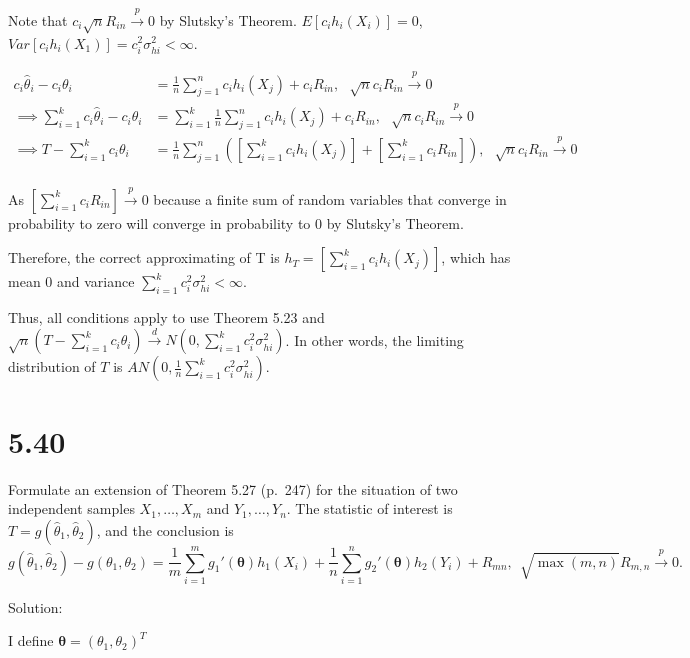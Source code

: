 \documentclass[
  letterpaper,
  DIV=11,
  numbers=noendperiod]{scrreprt}
\begin{document}
Note that \(c_i \sqrt nR_{in} \overset p \to 0\) by Slutsky's Theorem.
\(E[c_i h_i (X_i)] = 0\),
\(Var[c_i h_i (X_1)] = c_i^2 \sigma_{hi}^2 < \infty\).

\[\begin{aligned}
c_i \hat \theta_i - c_i\theta_i &= \frac 1 n \sum_{j=1}^n c_ih_i(X_j) + c_iR_{in},~~~\sqrt n c_iR_{in} \overset p \to 0 \\
\implies \sum_{i=1}^k c_i \hat \theta_i - c_i\theta_i &= \sum_{i=1}^k \frac 1 n \sum_{j=1}^n c_ih_i(X_j) + c_iR_{in},~~~\sqrt n c_iR_{in} \overset p \to 0 \\
\implies T -\sum_{i=1}^k c_i\theta_i &= \frac 1 n \sum_{j=1}^n \left(\left[\sum_{i=1}^k c_ih_i(X_j) \right] + \left[\sum_{i=1}^k c_iR_{in} \right]\right),~~~\sqrt n c_iR_{in} \overset p \to 0 \\
\end{aligned}\]

As \(\left[\sum_{i=1}^k c_iR_{in} \right] \overset p \to 0\) because a
finite sum of random variables that converge in probability to zero will
converge in probability to 0 by Slutsky's Theorem.

Therefore, the correct approximating of T is
\(h_T =\left[\sum_{i=1}^k c_ih_i(X_j) \right]\), which has mean 0 and
variance \(\sum_{i=1}^k c_i^2 \sigma_{hi}^2 < \infty\).

Thus, all conditions apply to use Theorem 5.23 and
\(\sqrt n\left(T -\sum_{i=1}^k c_i\theta_i \right) \overset d \to N\left(0, \sum_{i=1}^k c_i^2 \sigma_{hi}^2\right)\).
In other words, the limiting distribution of \(T\) is
\(AN\left(0, \frac 1 n \sum_{i=1}^k c_i^2 \sigma_{hi}^2\right)\).

\newpage

\hypertarget{section-35}{%
\section{5.40}\label{section-35}}

Formulate an extension of Theorem 5.27 (p.~247) for the situation of two
independent samples \(X_1, \dots, X_m\) and \(Y_1, \dots, Y_n\). The
statistic of interest is \(T = g(\hat \theta_1, \hat \theta_2)\), and
the conclusion is
\[g(\hat \theta_1, \hat \theta_2) - g(\theta_1, \theta_2) = \frac 1 m \sum_{i=1}^m g_1'(\boldsymbol \theta) h_1(X_i) + \frac 1 n \sum_{i=1}^n g_2'(\boldsymbol \theta) h_2(Y_i) + R_{mn},~~ \sqrt{\max(m,n)} R_{m,n} \overset p \to 0.\]

Solution:

I define \(\boldsymbol \theta = (\theta_1, \theta_2)^T\)
\end{document}
